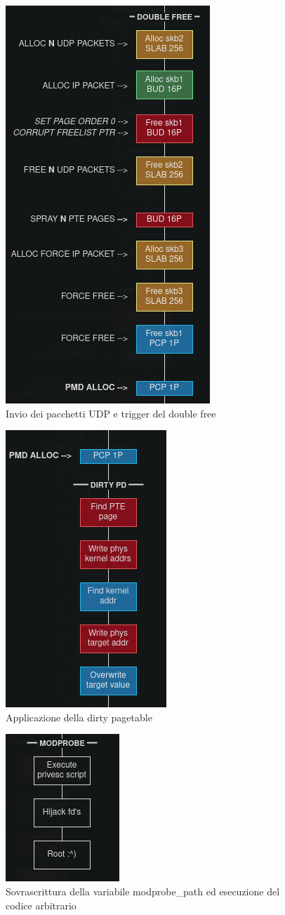 \documentclass{article}
\begin{document}
\begin{figure}[h]
  \begin{center}
    \includegraphics[width=.3\textwidth]{figures/ch1/poc-2.png}
  \end{center}
  \caption{Invio dei pacchetti UDP e trigger del double free}\label{fig:poc-2}
\end{figure}

\begin{figure}[h]
  \begin{center}
    \includegraphics[width=.15\textwidth]{figures/ch1/poc-3.png}
  \end{center}
  \caption{Applicazione della dirty pagetable}\label{fig:poc-3}
\end{figure}

\begin{figure}[h]
  \begin{center}
    \includegraphics[width=.15\textwidth]{figures/ch1/poc-4.png}
  \end{center}
  \caption{Sovrascrittura della variabile modprobe\_path ed esecuzione del codice arbitrario}\label{fig:poc-4}
\end{figure}
\end{document}
